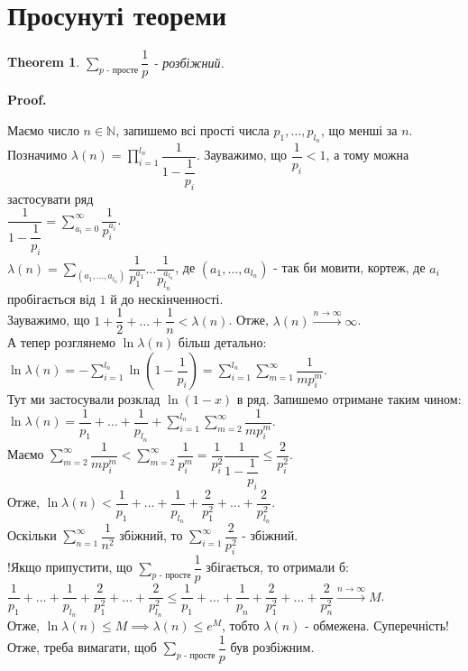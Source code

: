\documentclass[a4paper, 14pt]{extarticle}
\makeatletter
\theoremstyle{theoremdd}
\newtheorem{theorem}{Theorem}[subsection]
\theoremstyle{theoremdd}
\theoremstyle{theoremdd}
\theoremstyle{theoremdd}
\theoremstyle{theoremdd}
\theoremstyle{theoremdd}
\theoremstyle{theoremdd}
\theoremstyle{theoremdd}
\def\qed{$\blacksquare$}
\renewenvironment{proof}[1][Proof.\\]{\par
\pushQED{\hfill \qed}%
\normalfont \topsep6\p@\@plus6\p@\relax
\trivlist
\item\relax
{\bfseries
#1\@addpunct{.}}\hspace\labelsep\ignorespaces
}{%
\popQED\endtrivlist\@endpefalse
}
\makeatother
\begin{document}
\section{Просунуті теореми}
\begin{theorem}
$\displaystyle\sum_{p \text{ - просте}} \dfrac{1}{p}$ - розбіжний.
\end{theorem}

\begin{proof}
Маємо число $n \in \mathbb{N}$, запишемо всі прості числа $p_1,\dots,p_{l_n}$, що менші за $n$. Позначимо $\lambda(n) = \displaystyle\prod_{i=1}^{l_n} \dfrac{1}{1-\dfrac{1}{p_i}}$. Зауважимо, що $\dfrac{1}{p_i} < 1$, а тому можна застосувати ряд\\
$\dfrac{1}{1-\dfrac{1}{p_i}} = \displaystyle\sum_{a_i=0}^\infty \dfrac{1}{p_i^{a_i}}$.\\
$\lambda(n) = \displaystyle\sum_{(a_1,\dots,a_{l_n})} \dfrac{1}{p_1^{a_1}} \dots \dfrac{1}{p_{l_n}^{a_{l_n}}}$, де $(a_1,\dots,a_{l_n})$ - так би мовити, кортеж, де $a_i$ пробігається від $1$ й до нескінченності.\\
Зауважимо, що $1+\dfrac{1}{2}+\dots+\dfrac{1}{n} < \lambda(n)$. Отже, $\lambda(n) \overset{n \to \infty}{\to} \infty$.\\
А тепер розглянемо $\ln \lambda(n)$ більш детально:\\
$\ln \lambda(n) = -\displaystyle\sum_{i=1}^{l_n} \ln\left( 1 - \dfrac{1}{p_i} \right) = \sum_{i=1}^{l_n} \sum_{m=1}^\infty \dfrac{1}{mp_i^{m}}$.\\
Тут ми застосували розклад $\ln(1-x)$ в ряд. Запишемо отримане таким чином:\\
$\displaystyle\ln \lambda(n) = \dfrac{1}{p_1} + \dots + \dfrac{1}{p_{l_n}} + \sum_{i=1}^{l_n} \sum_{m=2}^\infty \dfrac{1}{mp_i^{m}}$.\\
Маємо $\displaystyle\sum_{m=2}^\infty \dfrac{1}{mp_i^m} < \sum_{m=2}^\infty \dfrac{1}{p_i^m} = \dfrac{1}{p_i^2} \dfrac{1}{1-\dfrac{1}{p_i}} \leq \dfrac{2}{p_i^2}$.\\
Отже, $\ln \lambda(n) < \dfrac{1}{p_1} + \dots + \dfrac{1}{p_{l_n}} + \dfrac{2}{p_1^2} + \dots + \dfrac{2}{p_{l_n}^2}$.\\
Оскільки $\displaystyle\sum_{n=1}^\infty \dfrac{1}{n^2}$ збіжний, то $\displaystyle\sum_{i=1}^\infty \dfrac{2}{p_i^2}$ - збіжний.\\
!Якщо припустити, що $\displaystyle\sum_{p \text{ - просте}} \dfrac{1}{p}$ збігається, то отримали б:\\
$\dfrac{1}{p_1} + \dots + \dfrac{1}{p_{l_n}} + \dfrac{2}{p_1^2} + \dots + \dfrac{2}{p_{l_n}^2} \leq \dfrac{1}{p_1} + \dots + \dfrac{1}{p_{n}} + \dfrac{2}{p_1^2} + \dots + \dfrac{2}{p_{n}^2} \overset{n \to \infty}{\to} M$.\\
Отже, $\ln \lambda(n) \leq M \implies \lambda(n) \leq e^M$, тобто $\lambda(n)$ - обмежена. Суперечність!\\
Отже, треба вимагати, щоб $\displaystyle\sum_{p \text{ - просте}} \dfrac{1}{p}$ був розбіжним.
\end{proof}
\end{document}
